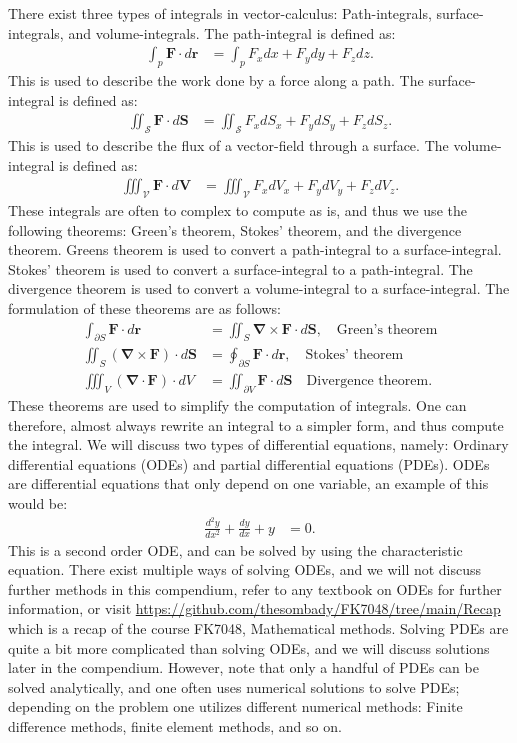 \documentclass[a4paper]{article}
\newcommand{\curl}[1]{\mathbf{\nabla}\times \mathbf{#1}}
\newcommand{\dive}[1]{\mathbf{\nabla}\cdot \mathbf{#1}}
\begin{document}
\vspace{0.5cm}\noindent
There exist three types of integrals in vector-calculus: Path-integrals, surface-integrals, and volume-integrals. The path-integral is defined as:
\begin{align*}
    \int_{p} \mathbf{F}\cdot d\mathbf{r} &= \int_{p} F_x dx + F_y dy + F_z dz.
\end{align*}This is used to describe the work done by a force along a path. The surface-integral is defined as:
\begin{align*}
    \iint_{\mathcal{S}} \mathbf{F}\cdot d\mathbf{S} &= \iint_{\mathcal{S}} F_x dS_x + F_y dS_y + F_z dS_z.
\end{align*}This is used to describe the flux of a vector-field through a surface. The volume-integral is defined as:
\begin{align*}
    \iiint_{\mathcal{V}} \mathbf{F}\cdot d\mathbf{V} &= \iiint_{\mathcal{V}} F_x dV_x + F_y dV_y + F_z dV_z.
\end{align*}These integrals are often to complex to compute as is, and thus we use the following theorems: Green's theorem, Stokes' theorem, and the divergence theorem.
Greens theorem is used to convert a path-integral to a surface-integral. Stokes' theorem is used to convert a surface-integral to a path-integral. The divergence theorem is used to convert a volume-integral to a surface-integral.
The formulation of these theorems are as follows:
\begin{align*}
    \int_{\partial S} \mathbf{F}\cdot d\mathbf{r} &= \iint_{S} \curl{F}\cdot d\mathbf{S},\quad \text{Green's theorem}\\
    \iint_{S} \left(\curl{F}\right)\cdot d\mathbf{S} &= \oint_{\partial S} \mathbf{F}\cdot d\mathbf{r},\quad \text{Stokes' theorem}\\
    \iiint_{V} \left(\dive{F}\right)\cdot dV &= \iint_{\partial V} \mathbf{F}\cdot d\mathbf{S}\quad \text{Divergence theorem}.
\end{align*}These theorems are used to simplify the computation of integrals. One can therefore, almost always rewrite an integral to a simpler form, and thus compute the integral.
We will discuss two types of differential equations, namely: Ordinary differential equations (ODEs) and partial differential equations (PDEs). ODEs are differential equations that only depend on one variable, an example of this would be:
\begin{align*}
    \frac{d^2y}{dx^2} + \frac{dy}{dx} + y &= 0.
\end{align*}This is a second order ODE, and can be solved by using the characteristic equation. There exist multiple ways of solving ODEs, and we will not discuss further methods in this compendium, refer to any textbook on ODEs for further information, or visit \url{https://github.com/thesombady/FK7048/tree/main/Recap} which is a recap of the course FK7048, Mathematical methods.
Solving PDEs are quite a bit more complicated than solving ODEs, and we will discuss solutions later in the compendium. However, note that only a handful of PDEs can be solved analytically, and one often uses numerical solutions to solve PDEs; depending on the problem one utilizes different numerical methods: Finite difference methods, finite element methods, and so on.
\end{document}
